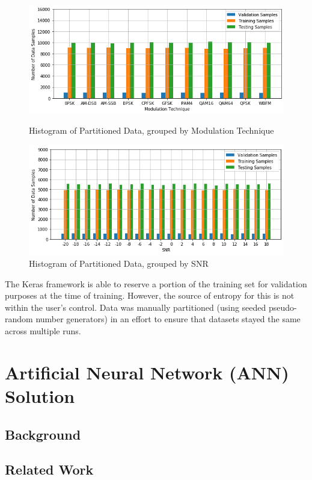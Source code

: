 \documentclass[12pt,journal,onecolumn,twoside]{IEEEtran}
\begin{document}
\begin{figure}[h]
	\centering
	\includegraphics[scale=0.6]{stratSampleModTech}
	\caption{Histogram of Partitioned Data, grouped by Modulation Technique}
	\includegraphics[scale=0.6]{stratSampleSNR}
	\caption{Histogram of Partitioned Data, grouped by SNR}		
\end{figure}

The Keras framework is able to reserve a portion of the training set for validation purposes at the time of training. However, the source of entropy for this is not within the user's control. Data was manually partitioned (using seeded pseudo-random number generators) in an effort to ensure that datasets stayed the same across multiple runs.

\section{Artificial Neural Network (ANN) Solution}

\subsection{Background}

\subsection{Related Work}
\end{document}
